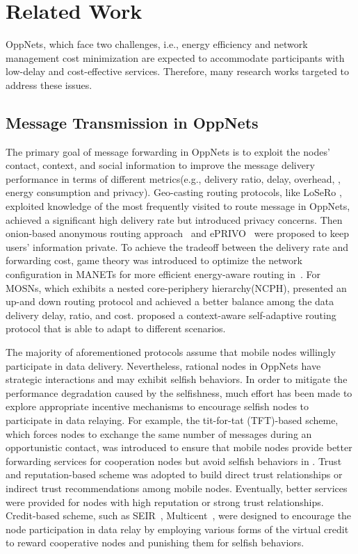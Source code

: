 \section{Related Work}
\label{sec:related}
OppNets, which face two challenges,
i.e., energy efficiency and network management cost minimization
are expected to accommodate participants
with low-delay and cost-effective services.
Therefore, many research works targeted to address these issues.

\subsection{Message Transmission in OppNets}
The primary goal of message forwarding in OppNets
is to exploit the nodes' contact, context,
and social information to improve
the message delivery performance
in terms of different metrics(e.g.,
delivery ratio, delay, overhead,
, energy consumption and privacy).
Geo-casting routing protocols, like LoSeRo
\cite{DBLP:journals/tmc/CostantinoMMS20},
exploited knowledge of the most frequently visited
to route message in OppNets, achieved a significant
high delivery rate but
introduced privacy concerns.
Then onion-based anonymous routing approach~\cite{DBLP:conf/icdcs/SakaiSKWA16}
and ePRIVO~\cite{DBLP:journals/tvt/MagaiaBPC18} were proposed to keep users' information private.
To achieve the tradeoff between the delivery rate
and forwarding cost,
game theory was introduced to
optimize the network configuration in MANETs
for more efficient energy-aware routing in~\cite{DBLP:journals/monet/MaoZ15}.
For MOSNs, which exhibits a nested core-periphery hierarchy(NCPH),
\cite{DBLP:journals/tvt/Zheng017} presented an up-and down routing protocol and
achieved a better balance
among the data delivery delay, ratio, and cost.
\cite{DBLP:journals/adhoc/RosasGH20} proposed
a context-aware self-adaptive routing protocol
that is able to adapt to different scenarios.

The majority of aforementioned protocols
assume that mobile nodes willingly participate in data delivery. Nevertheless,
rational nodes in OppNets have strategic interactions
and may exhibit selfish behaviors.
In order to mitigate the performance degradation
caused by the selfishness,
much effort has been made to explore
appropriate incentive mechanisms
to encourage selfish nodes to
participate in data relaying.
For example, the tit-for-tat (TFT)-based scheme,
which forces nodes to exchange the same number
of messages during an opportunistic contact,
was introduced to ensure that mobile nodes provide better
forwarding services for cooperation nodes
but avoid selfish behaviors in
\cite{DBLP:journals/tmc/MastronardePXLS16,
DBLP:journals/twc/HsuD17}.
Trust and reputation-based scheme
\cite{DBLP:journals/tvt/ChenLWW16,DBLP:conf/mdm/JethawaM18}
was adopted to build direct trust relationships
or indirect trust recommendations among mobile nodes.
Eventually, better services were provided
for nodes with high reputation
or strong trust relationships.
Credit-based scheme, such as SEIR~\cite{DBLP:conf/ciss/ChhabraVS17},
Multicent~\cite{DBLP:journals/tpds/ChenSY15},
were designed to encourage the node participation
in data relay by employing various forms
of the virtual credit to
reward cooperative nodes
and punishing them for selfish behaviors.
